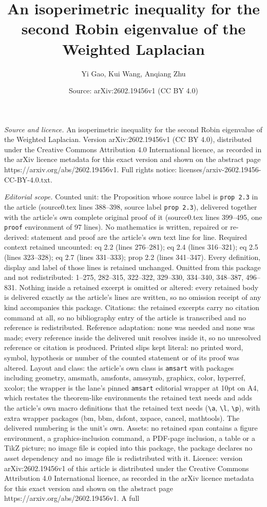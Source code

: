 \documentclass[10pt,a4paper]{amsart}
\title[An isoperimetric inequality for the second Robin eigenvalue ]{An isoperimetric inequality for the second Robin eigenvalue of the Weighted Laplacian}
\author{Yi Gao, Kui Wang, Anqiang Zhu}
\date{Source: arXiv:2602.19456v1 (CC BY 4.0)}
\begin{document}
\maketitle

\noindent\emph{Source and licence.} An isoperimetric inequality for the second Robin eigenvalue of the Weighted Laplacian. Version arXiv:2602.19456v1 (CC BY 4.0), distributed under the Creative Commons Attribution 4.0 International licence, as recorded in the arXiv licence metadata for this exact version and shown on the abstract page https://arxiv.org/abs/2602.19456v1. Full rights notice: licenses/arxiv-2602.19456-CC-BY-4.0.txt.\par\smallskip

\noindent\textit{Editorial scope.} Counted unit: the Proposition whose source label is \texttt{prop 2.3} in the article (source0.tex lines 388--398, source label \texttt{prop 2.3}), delivered together with the article's own complete original proof of it (source0.tex lines 399--495, one \texttt{proof} environment of 97 lines). No mathematics is written, repaired or re-derived: statement and proof are the article's own text line for line. Required context retained uncounted: eq 2.2 (lines 276--281); eq 2.4 (lines 316--321); eq 2.5 (lines 323--328); eq 2.7 (lines 331--333); prop 2.2 (lines 341--347). Every definition, display and label of those lines is retained unchanged. Omitted from this package and not redistributed: 1--275, 282--315, 322--322, 329--330, 334--340, 348--387, 496--831. Nothing inside a retained excerpt is omitted or altered: every retained body is delivered exactly as the article's lines are written, so no omission receipt of any kind accompanies this package. Citations: the retained excerpts carry no citation command at all, so no bibliography entry of the article is transcribed and no reference is redistributed. Reference adaptation: none was needed and none was made; every reference inside the delivered unit resolves inside it, so no unresolved reference or citation is produced. Printed slips kept literal: no printed word, symbol, hypothesis or number of the counted statement or of its proof was altered. Layout and class: the article's own class is \texttt{amsart} with packages including geometry, amsmath, amsfonts, amssymb, graphicx, color, hyperref, xcolor; the wrapper is the lane's pinned \texttt{amsart} editorial wrapper at 10pt on A4, which restates the theorem-like environments the retained text needs and adds the article's own macro definitions that the retained text needs (\texttt{\textbackslash a}, \texttt{\textbackslash l}, \texttt{\textbackslash p}), with extra wrapper packages (bm, bbm, dsfont, xspace, cancel, mathtools). The delivered numbering is the unit's own. Assets: no retained span contains a figure environment, a graphics-inclusion command, a PDF-page inclusion, a table or a TikZ picture; no image file is copied into this package, the package declares no asset dependency and no image file is redistributed with it. Licence: version arXiv:2602.19456v1 of this article is distributed under the Creative Commons Attribution 4.0 International licence, as recorded in the arXiv licence metadata for this exact version and shown on the abstract page https://arxiv.org/abs/2602.19456v1. A full 
\end{document}
